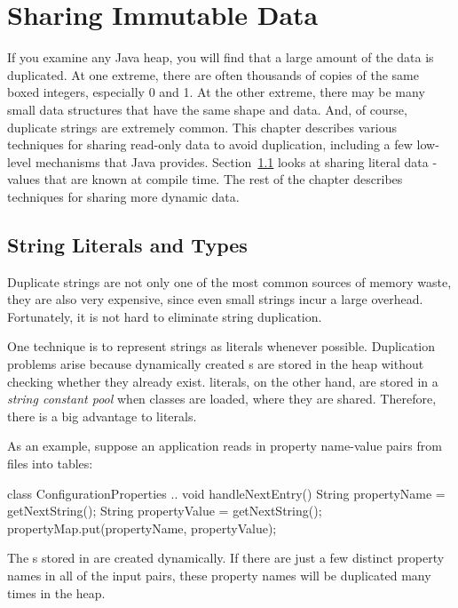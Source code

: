 \chapter{Sharing Immutable Data}
\label{chapter:sharing-immutable-data}

 If you examine any Java
heap, you will find that a
large amount of the data is duplicated. At one extreme, 
there are often thousands of copies of the same boxed
integers, especially 0 and 1. At the other extreme, there may be many
 small data
structures that have the same shape and data. 
And, of course, duplicate strings are extremely common.
This chapter describes various
techniques for sharing read-only data to avoid
duplication, including a few low-level mechanisms that Java provides.
Section~\ref{sec:literals} looks at sharing literal data - values that
are known at compile time. The rest of the chapter describes techniques for sharing more
dynamic data.

\section{String Literals and  Types}
\label{sec:literals}

Duplicate strings are not only one of the
most common sources of memory waste, they are also very expensive, since even
small strings incur a large overhead. Fortunately, it is not
hard to eliminate string duplication. 

 One technique is to represent strings as  
literals whenever possible. Duplication problems arise because dynamically
 created s
are stored in the heap without checking whether they already
exist.  literals, on the other hand, are stored in a
\emph{string constant pool} when classes
are loaded, where they are shared. Therefore, there is a big advantage to
 literals.

 As an example, suppose an application
reads in property name-value pairs from files into tables:
\begin{shortlisting}
class ConfigurationProperties {
    ..
	void handleNextEntry() {
		String propertyName = getNextString();
		String propertyValue = getNextString();
		propertyMap.put(propertyName, propertyValue);
	}
}
\end{shortlisting}
The s stored in  are created dynamically. If 
there are just a few distinct property names in all of the input pairs, these
property names will be duplicated many times in the heap.

